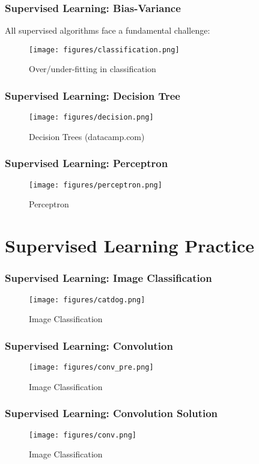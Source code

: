 \documentclass[aspectratio=169]{beamer}
\begin{document}
\begin{frame}
	\frametitle{Supervised Learning: Bias-Variance}
	All supervised algorithms face a fundamental challenge:
	\begin{figure}
		\texttt{[image: figures/classification.png]}
		\caption{Over/under-fitting in classification}\label{fig:}
	\end{figure}
\end{frame}

\begin{frame}
	\frametitle{Supervised Learning: Decision Tree}

	\begin{figure}
		\texttt{[image: figures/decision.png]}
		\caption{Decision Trees (datacamp.com)}\label{fig:}
	\end{figure}
\end{frame}

\begin{frame}
	\frametitle{Supervised Learning: Perceptron}
	\begin{figure}
		\texttt{[image: figures/perceptron.png]}
		\caption{Perceptron}\label{fig:}
	\end{figure}
\end{frame}
\section{Supervised Learning Practice}
\begin{frame}
	\frametitle{Supervised Learning: Image Classification}
	\begin{figure}
		\texttt{[image: figures/catdog.png]}
		\caption{Image Classification}\label{fig:}
	\end{figure}
\end{frame}

\begin{frame}
	\frametitle{Supervised Learning: Convolution}
	\begin{figure}
		\texttt{[image: figures/conv\_pre.png]}
		\caption{Image Classification}\label{fig:}
	\end{figure}
\end{frame}

\begin{frame}
	\frametitle{Supervised Learning: Convolution Solution}
	\begin{figure}
		\texttt{[image: figures/conv.png]}
		\caption{Image Classification}\label{fig:}
	\end{figure}
\end{frame}
\end{document}
